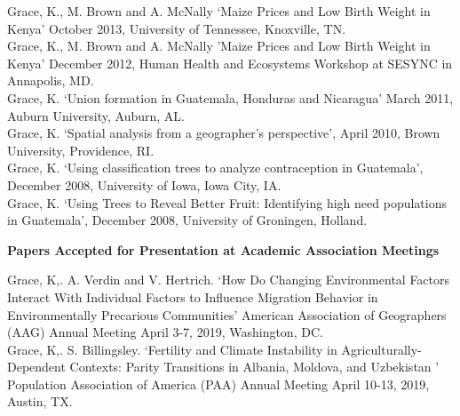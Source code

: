\documentclass[11pt]{article} %
\begin{document}
\noindent
Grace, K., M. Brown and A. McNally `Maize Prices and Low Birth Weight in Kenya' October 2013,  University of Tennessee, Knoxville, TN. \\

\noindent
Grace, K., M. Brown and A. McNally 'Maize Prices and Low Birth Weight in Kenya' December 2012,  Human Health and Ecosystems Workshop at SESYNC in Annapolis, MD.\\

\noindent
Grace, K. `Union formation in Guatemala, Honduras and Nicaragua' March 2011, Auburn University, Auburn, AL. \\

\noindent
Grace, K. `Spatial analysis from a geographer's perspective', April 2010, Brown University, Providence, RI. \\

\noindent
Grace, K. `Using classification trees to analyze contraception in Guatemala', December 2008, University of Iowa, Iowa City, IA.\\

\noindent
Grace, K. `Using Trees to Reveal Better Fruit: Identifying high need populations in Guatemala', December 2008, University of Groningen, Holland.\\
 

\vspace{.5cm}


\noindent
\textbf {Papers Accepted for Presentation at Academic Association Meetings }

\noindent





\noindent
Grace, K,. A. Verdin and V. Hertrich. `How Do Changing Environmental Factors Interact With Individual Factors to Influence Migration Behavior in Environmentally Precarious Communities'  American Association of Geographers (AAG) Annual Meeting April 3-7, 2019, Washington, DC.\\

\noindent
Grace, K,. S. Billingsley. `Fertility and Climate Instability in Agriculturally-Dependent Contexts: Parity Transitions in Albania, Moldova, and Uzbekistan ' Population Association of America (PAA) Annual Meeting April 10-13, 2019, Austin, TX.\\
\end{document}
